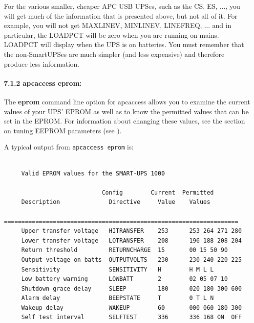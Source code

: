 {{{{For the various smaller, cheaper APC USB UPSes, such as the CS, ES, ..., you
will get much of the information that is presented above, but not all of it.
For example, you will not get MAXLINEV, MINLINEV, LINEFREQ, ... and in
particular, the LOADPCT will be zero when you are running on mains. LOADPCT
will display when the UPS is on batteries.  You must remember that the
non-SmartUPSes are much simpler (and less expensive) and therefore produce
less information. 

\label{apcaccess-eprom}

\paragraph*{7.1.2 apcaccess eprom:}

\label{index-apcaccess-eeprom-114}
\label{index-eeprom_002c-apcaccess-115}
The {\bf eprom} command line option for apcaccess allows you to examine the
current values of your UPS' EPROM as well as to know the permitted values that
can be set in the EPROM. For information about changing these values, see the
section on tuning EEPROM parameters (see 
).  

A typical output from {\tt apcaccess eprom} is: 

\footnotesize
\begin{verbatim}
     
     Valid EPROM values for the SMART-UPS 1000
     
                            Config        Current  Permitted
     Description              Directive     Value    Values
     ===================================================================
     Upper transfer voltage   HITRANSFER    253      253 264 271 280
     Lower transfer voltage   LOTRANSFER    208      196 188 208 204
     Return threshold         RETURNCHARGE  15       00 15 50 90
     Output voltage on batts  OUTPUTVOLTS   230      230 240 220 225
     Sensitivity              SENSITIVITY   H        H M L L
     Low battery warning      LOWBATT       2        02 05 07 10
     Shutdown grace delay     SLEEP         180      020 180 300 600
     Alarm delay              BEEPSTATE     T        0 T L N
     Wakeup delay             WAKEUP        60       000 060 180 300
     Self test interval       SELFTEST      336      336 168 ON  OFF
\end{verbatim}
\normalsize

\label{Apcupsd-Notification-and-Events}

}}}}
